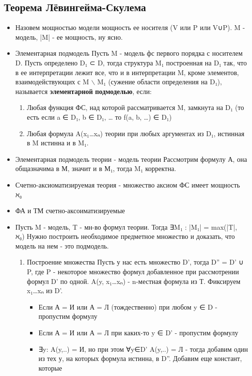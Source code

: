 \documentclass[11pt]{article}
\begin{document}
\subsection{Теорема Лёвингейма-Скулема}
\label{sec-17-3}
\begin{itemize}
\item Назовем мощностью модели мощность ее носителя (V или P или V∪P).
M - модель, |M| - ее мощность, ну ясно.
\item Элементарная подмодель
Пусть M - модель фс первого порядка с носителем D. Пусть определено
D₁ ⊂ D, тогда структура M₁ построенная на D₁ так, что в ее интерпретации
лежит все, что и в интерпретации M, кроме элементов, взаимодействующих
с M $\backslash$ M₁ (сужение области определения на D₁), называется \textbf{элементарной}
\textbf{подмоделью}, если:
\begin{enumerate}
\item Любая функция ФС, над которой рассматривается M, замкнута на
D₁ (то есть если a ∈ D₁, b ∈ D₁, \ldots{} то f(a, b, \ldots{}) ∈ D₁)
\item Любая формула A(x₁\ldots{}xₙ) теории при любых аргументах из D₁,
истинная в M истинна и в M₁.
\end{enumerate}
\item Элементарная подмодель теории - модель теории
Рассмотрим формулу А, она общазначима в М, значит и в М₁, тогда M₁ корректна.
\item Счетно-аксиоматизируемая теория - множество аксиом ФС имеет мощность ℵ₀
\item ФА и ТМ счетно-аксоиматизируемые
\item Пусть M - модель, T - мн-во формул теории. Тогда ∃M₁ : |M₁| = max(|T|, ℵ₀)
Нужно построить необходимое предметное множество и доказать,
что модель на нем - это подмодель.
\begin{enumerate}
\item Построение множества
Пусть у нас есть множество D', тогда D'' = D' ∪ P, где P - некоторое
множество формул добавленное при рассмотрении формул D' по одной.
A(y, x₁\ldots{}xₙ) - n-местная формула из Т. Фиксируем x₁\ldots{}xₙ из D'.
\begin{itemize}
\item Если А = И или А = Л (тождественно) при любом y ∈ D - пропустим формулу
\item Если А = И или А = Л при каких-то y ∈ D' - пропустим формулу
\item ∃y: A(y,..) = И, но при этом ∀y∈D' A(y,..) = Л - тогда добавим один из
тех у, на которых формула истинна, в D''. Добавим еще констант, которые

\end{itemize}
\end{enumerate}
\end{itemize}
\end{document}
